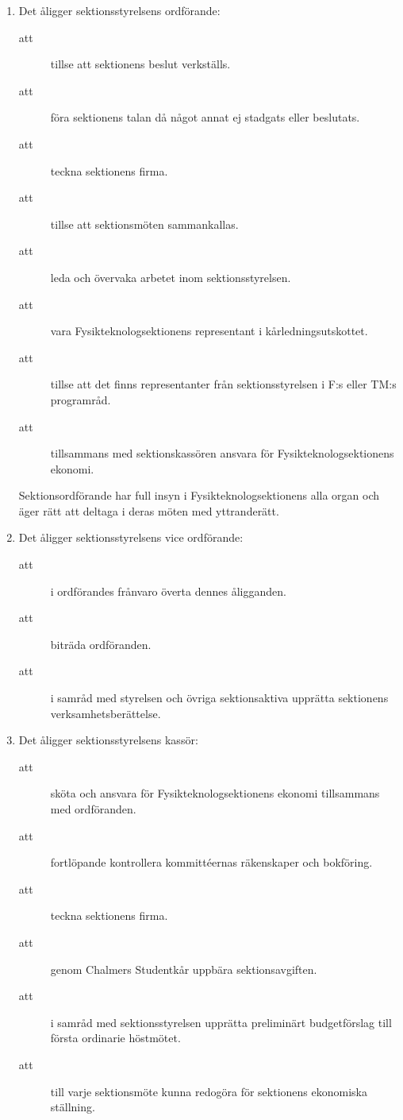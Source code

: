 \documentclass[11pt,a4paper]{article}
\begin{document}
\begin{enumerate}[\thesubsection .1]
  \item Det åligger sektionsstyrelsens ordförande:
    \begin{description}
      \item[att] tillse att sektionens beslut verkställs.
      \item[att] föra sektionens talan då något annat ej stadgats eller beslutats.
      \item[att] teckna sektionens firma.
      \item[att] tillse att sektionsmöten sammankallas.
      \item[att] leda och övervaka arbetet inom sektionsstyrelsen.
      \item[att] vara Fysikteknologsektionens representant i kårledningsutskottet.
      \item[att] tillse att det finns representanter från sektionsstyrelsen i F:s eller TM:s programråd.
      \item[att] tillsammans med sektionskassören ansvara för Fysikteknologsektionens ekonomi.

    \end{description}
    \noindent
    Sektionsordförande har full insyn i Fysikteknologsektionens alla
    organ och äger rätt att deltaga i deras möten med yttranderätt.

  \item Det åligger sektionsstyrelsens vice ordförande:
    \begin{description}
 
      \item[att] i ordförandes frånvaro överta dennes åligganden.
      \item[att] biträda ordföranden.
      \item[att] i samråd med styrelsen och övriga sektionsaktiva upprätta sektionens verksamhetsberättelse.
    
    \end{description}
  \item Det åligger sektionsstyrelsens  kassör:
    \begin{description}
      \item[att] sköta och ansvara för Fysikteknologsektionens ekonomi tillsammans med ordföranden.
      \item[att] fortlöpande kontrollera kommittéernas räkenskaper och bokför\-ing.
      \item[att] teckna sektionens firma.
      \item[att] genom Chalmers Studentkår uppbära sektionsavgiften.
      \item[att] i samråd med sektionsstyrelsen upprätta preliminärt budgetförslag till första ordinarie höstmötet.
      \item[att] till varje sektionsmöte kunna redogöra för sektionens ekonomiska ställning.
    \end{description}


\end{enumerate}
\end{document}
